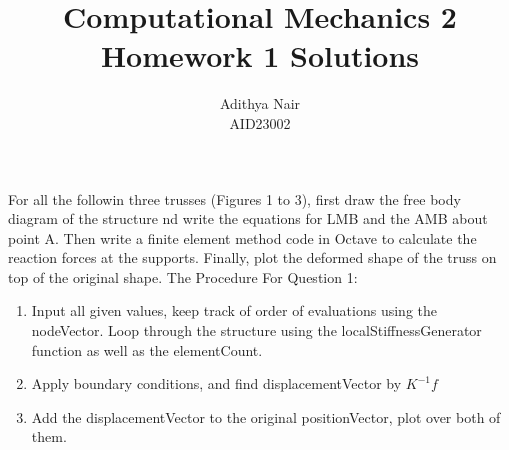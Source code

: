 \documentclass{article}
\title{Computational Mechanics 2 \\ Homework 1 Solutions}
\author{Adithya Nair \\ AID23002}
\begin{document}
\maketitle
 For all the followin three trusses (Figures 1 to 3), first draw the free body diagram of the structure nd write the equations for LMB and the AMB about point A. Then write a finite element method code in Octave to calculate the reaction forces at the supports. Finally, plot the deformed shape of the truss on top of the original shape. 
\pagebreak
The Procedure For Question 1:
\begin{enumerate}
    \item Input all given values, keep track of order of evaluations using the nodeVector. Loop through the structure using the localStiffnessGenerator function as well as the elementCount.
    \item Apply boundary conditions, and find displacementVector by $K^{-1}f$
    \item Add the displacementVector to the original positionVector, plot over both of them.
\end{enumerate}
\end{document}
